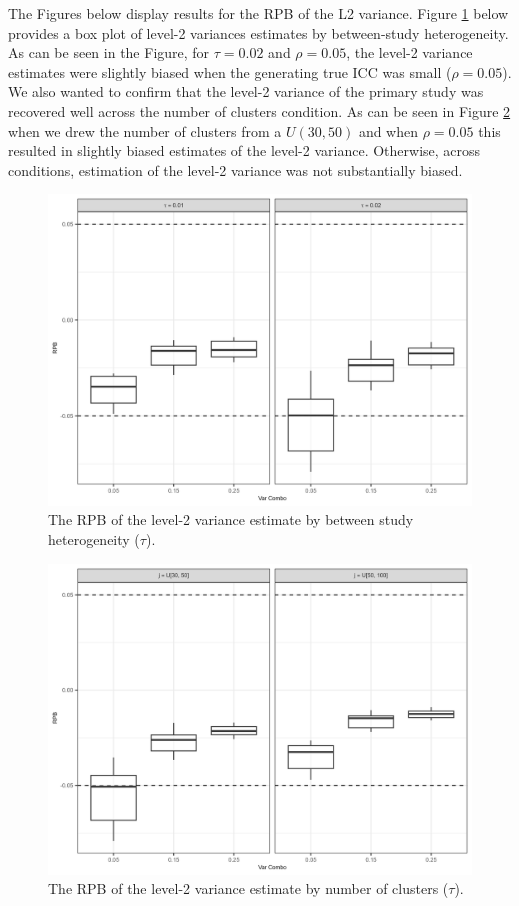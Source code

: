 The Figures below display results for the RPB of the L2 variance. Figure \ref{fig:RPB_L2_tau} below provides a box plot of level-2 variances estimates by between-study heterogeneity. As can be seen in the Figure, for $\tau = 0.02$ and $\rho = 0.05$, the level-2 variance estimates were slightly biased when the generating true ICC was small ($\rho = 0.05$). We also wanted to confirm that the level-2 variance of the primary study was recovered well across the number of clusters condition. As can be seen in Figure \ref{fig:RPB_L2_j_mean} when we drew the number of clusters from a $U(30, 50)$ and when $\rho = 0.05$ this resulted in slightly biased estimates of the level-2 variance. Otherwise, across conditions, estimation of the level-2 variance was not substantially biased.

\begin{figure}[h!]
\centerline{\includegraphics{Main/RPB_L2_tau_mean.png}}
    \caption{The RPB of the level-2 variance estimate by between study heterogeneity ($\tau$).\label{fig:RPB_L2_tau}}
\end{figure}



\begin{figure}[h!]
\centerline{\includegraphics{Main/RPB_L2_j_mean.png}}
    \caption{The RPB of the level-2 variance estimate by number of clusters ($\tau$).\label{fig:RPB_L2_j_mean}}
\end{figure}

